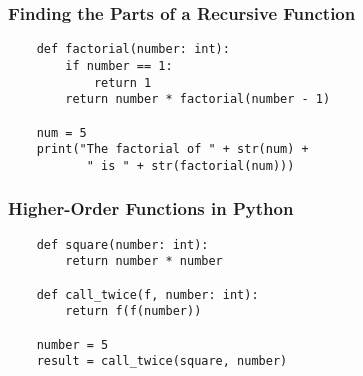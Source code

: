 \documentclass[14pt,aspectratio=169]{beamer}
\begin{document}
%
\begin{frame}[fragile]
  \frametitle{Finding the Parts of a Recursive Function}
  \hspace*{-.8in}
  \begin{minipage}{6in}
    \begin{verbatim}
    def factorial(number: int):
        if number == 1:
            return 1
        return number * factorial(number - 1)

    num = 5
    print("The factorial of " + str(num) +
           " is " + str(factorial(num)))
    \end{verbatim}
  \end{minipage}
  \vspace*{.05in}
\end{frame}

%
\begin{frame}[fragile]
  \frametitle{Higher-Order Functions in Python}
  \hspace*{-.6in}
  \begin{minipage}{6in}
    \begin{verbatim}
    def square(number: int):
        return number * number

    def call_twice(f, number: int):
        return f(f(number))

    number = 5
    result = call_twice(square, number)
    \end{verbatim}
  \end{minipage}
  \vspace*{.05in}
\end{frame}
\end{document}
